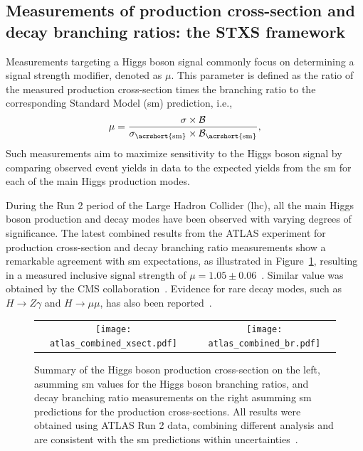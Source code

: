 \subsection{Measurements of production cross-section and decay branching ratios: the STXS framework}
\label{sec:stxs_yukawa}


Measurements targeting a Higgs boson signal commonly focus on determining a signal strength modifier, denoted as $\mu$. This parameter is defined as the ratio of the measured production cross-section times the branching ratio to the corresponding Standard Model (\acrshort{sm}) prediction, i.e.,
\begin{equation}
\label{signal_strength}
    \mu = \frac{\sigma \times \mathcal{B}}{\sigma_{\mathrm{\acrshort{sm}}} \times \mathcal{B}_{\mathrm{\acrshort{sm}}}},
\end{equation}
Such measurements aim to maximize sensitivity to the Higgs boson signal by comparing observed event yields in data to the expected yields from the \acrshort{sm} for each of the main Higgs production modes.

During the Run 2 period of the Large Hadron Collider (\acrshort{lhc}), all the main Higgs boson production and decay modes have been observed with varying degrees of significance. The latest combined results from the ATLAS experiment for production cross-section and decay branching ratio measurements show a remarkable agreement with \acrshort{sm} expectations, as illustrated in Figure~\ref{higgs_mu}, resulting in a measured inclusive signal strength of $\mu = 1.05 \pm 0.06$~\cite{Nature_ATLAS}. Similar value was obtained by the CMS collaboration~\cite{CMS:2022dwd}. Evidence for rare decay modes, such as $H \to Z\gamma$ and $H \to \mu\mu$, has also been reported~\cite{Aad_2024,muon2021}.

\begin{figure}[htbp]
    \centering
    \begin{tabular}{cc}
    \texttt{[image: atlas\_combined\_xsect.pdf]} & 
    \texttt{[image: atlas\_combined\_br.pdf]}
    \end{tabular}
    \caption{Summary of the Higgs boson production cross-section on the left, asumming \acrshort{sm} values for the Higgs boson branching ratios, and decay branching ratio measurements on the right asumming \acrshort{sm} predictions for the production cross-sections. All results were obtained using ATLAS Run 2 data, combining different analysis and are consistent with the \acrshort{sm} predictions within uncertainties~\cite{Nature_ATLAS}.}
    \label{higgs_mu}
\end{figure}

